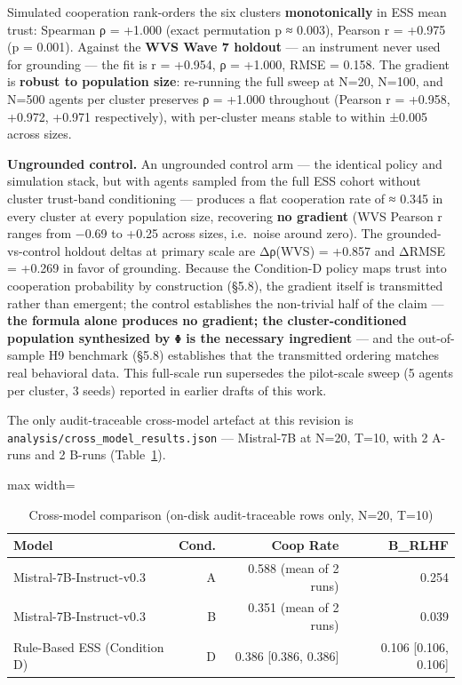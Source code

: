 Simulated cooperation rank-orders the six clusters \textbf{monotonically} in ESS mean trust: Spearman ρ = +1.000 (exact permutation p ≈ 0.003), Pearson r = +0.975 (p = 0.001). Against the \textbf{WVS Wave 7 holdout} — an instrument never used for grounding — the fit is r = +0.954, ρ = +1.000, RMSE = 0.158. The gradient is \textbf{robust to population size}: re-running the full sweep at N=20, N=100, and N=500 agents per cluster preserves ρ = +1.000 throughout (Pearson r = +0.958, +0.972, +0.971 respectively), with per-cluster means stable to within ±0.005 across sizes.

\textbf{Ungrounded control.} An ungrounded control arm — the identical policy and simulation stack, but with agents sampled from the full ESS cohort without cluster trust-band conditioning — produces a flat cooperation rate of ≈ 0.345 in every cluster at every population size, recovering \textbf{no gradient} (WVS Pearson r ranges from −0.69 to +0.25 across sizes, i.e.\ noise around zero). The grounded-vs-control holdout deltas at primary scale are Δρ(WVS) = +0.857 and ΔRMSE = +0.269 in favor of grounding. Because the Condition-D policy maps trust into cooperation probability by construction (§5.8), the gradient itself is transmitted rather than emergent; the control establishes the non-trivial half of the claim — \textbf{the formula alone produces no gradient; the cluster-conditioned population synthesized by \texttt{Φ} is the necessary ingredient} — and the out-of-sample H9 benchmark (§5.8) establishes that the transmitted ordering matches real behavioral data. This full-scale run supersedes the pilot-scale sweep (5 agents per cluster, 3 seeds) reported in earlier drafts of this work.


The only audit-traceable cross-model artefact at this revision is \texttt{analysis/cross\_model\_results.json} — Mistral-7B at N=20, T=10, with 2 A-runs and 2 B-runs (Table~\ref{tab:6}).


\begin{table}[H]
\centering
\caption{Cross-model comparison (on-disk audit-traceable rows only, N=20, T=10)}
\label{tab:6}
\footnotesize
\begin{adjustbox}{max width=\textwidth}
\begin{tabular}{lrrr}
\toprule
Model & Cond. & Coop Rate & B\_RLHF \\
\midrule
Mistral-7B-Instruct-v0.3 & A & 0.588 (mean of 2 runs) & 0.254 \\
Mistral-7B-Instruct-v0.3 & B & 0.351 (mean of 2 runs) & 0.039 \\
Rule-Based ESS (Condition D) & D & 0.386 [0.386, 0.386] & 0.106 [0.106, 0.106] \\
\bottomrule
\end{tabular}
\end{adjustbox}
\end{table}

